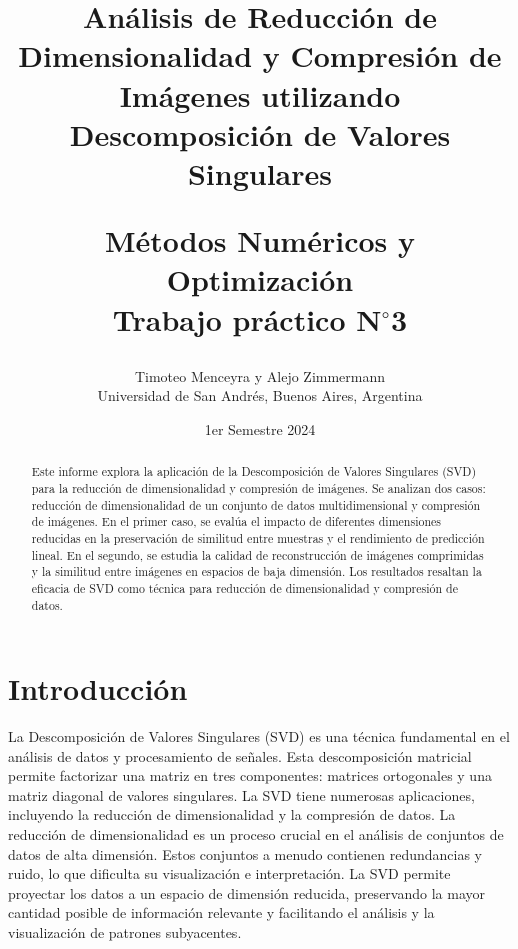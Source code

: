 \documentclass[12pt,a4]{article} %
\title{Análisis de Reducción de Dimensionalidad y Compresión de Imágenes utilizando Descomposición de Valores Singulares\\


\vspace{20mm}

 Métodos Numéricos y Optimización\\
 Trabajo práctico N$^{\circ}$3\\
}
\author{Timoteo Menceyra y Alejo Zimmermann\\ [2mm] %
\small Universidad de San Andrés, Buenos Aires, Argentina}
\date{1er Semestre 2024}
\begin{document}
\vspace{1cm} %



\maketitle


\begin{abstract}
Este informe explora la aplicación de la Descomposición de Valores Singulares (SVD) para la reducción de dimensionalidad y compresión de imágenes. Se analizan dos casos: reducción de dimensionalidad de un conjunto de datos multidimensional y compresión de imágenes. En el primer caso, se evalúa el impacto de diferentes dimensiones reducidas en la preservación de similitud entre muestras y el rendimiento de predicción lineal. En el segundo, se estudia la calidad de reconstrucción de imágenes comprimidas y la similitud entre imágenes en espacios de baja dimensión. Los resultados resaltan la eficacia de SVD como técnica para reducción de dimensionalidad y compresión de datos.\\
\vspace{2mm}
\end{abstract}


\raggedcolumns

\section{Introducción}
La Descomposición de Valores Singulares (SVD) \cite{burdenfaires} es una técnica fundamental en el análisis de datos y procesamiento de señales. Esta descomposición matricial permite factorizar una matriz en tres componentes: matrices ortogonales y una matriz diagonal de valores singulares. La SVD tiene numerosas aplicaciones, incluyendo la reducción de dimensionalidad y la compresión de datos. La reducción de dimensionalidad \cite{linaer_algebra} es un proceso crucial en el análisis de conjuntos de datos de alta dimensión. Estos conjuntos a menudo contienen redundancias y ruido, lo que dificulta su visualización e interpretación. La SVD permite proyectar los datos a un espacio de dimensión reducida, preservando la mayor cantidad posible de información relevante y facilitando el análisis y la visualización de patrones subyacentes.
\\
\end{document}
